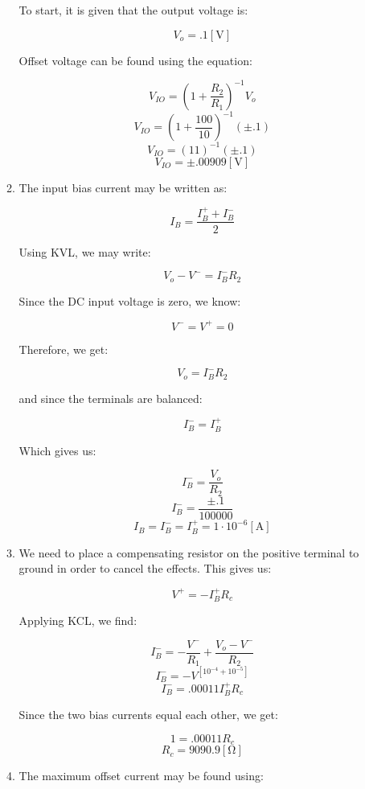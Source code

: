 \begin{enumerate}
\begin{enumerate}
        To start, it is given that the output voltage is:

        $$V_o=.1[\si{\volt}]$$

        Offset voltage can be found using the equation:

        $$V_{IO}=\left( 1+\frac{R_2}{R_1} \right)^{-1}V_o$$
        $$V_{IO}=\left( 1+\frac{100}{10} \right)^{-1}(\pm.1)$$
        $$V_{IO}=\left( 11 \right)^{-1}(\pm.1)$$
        $$\boxed{V_{IO}=\pm.00909[\si{\volt}]}$$

      \item 

        The input bias current may be written as:

        $$I_B=\frac{I_B^++I_B^-}{2}$$

        Using KVL, we may write:

        $$V_o-V^-=I_B^-R_2$$

        Since the DC input voltage is zero, we know:

        $$V^-=V^+=0$$

        Therefore, we get:

        $$V_o=I_B^-R_2$$

        and since the terminals are balanced:

        $$I_B^-=I_B^+$$

        Which gives us:

        $$I_B^-=\frac{V_o}{R_2}$$
        $$I_B^-=\frac{\pm.1}{100000}$$
        $$\boxed{I_B=I_B^-=I_B^+=1\cdot10^{-6}[\si{\ampere}]}$$

      \item 

        We need to place a compensating resistor on the positive terminal to ground in order to cancel the effects. This gives us:

        $$V^{+}=-I_B^{+}R_c$$

        Applying KCL, we find:

        $$I_B^{-}=-\frac{V^-}{R_1}+\frac{V_o-V^-}{R_2}$$
        $$I_B^{-}=-V^\left[ 10^{-4}+10^{-5} \right]$$
        $$I_B^{-}=.00011I_B^+R_c$$

        Since the two bias currents equal each other, we get:

        $$1=.00011R_c$$
        $$\boxed{R_c=9090.9[\si{\ohm}]}$$

      \item 

        The maximum offset current may be found using:


\end{enumerate}
\end{enumerate}

